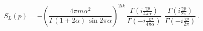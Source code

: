 \begin{equation}\label{S1}
S_L(p) =-\left(\frac{4\pi m\alpha^2}{\Gamma(1+2\alpha)\,\sin 2\pi\alpha }
\right)^{2ik}
\,\frac{\Gamma\left(i\frac{\gamma p}{4\pi\alpha}\right)}
{\Gamma\left(-i\frac{\gamma p}{4\pi\alpha}\right)}\,\
\frac{\Gamma\left(i\frac{\gamma p}{2\pi}\right)}
{\Gamma\left(-i\frac{\gamma p}{2\pi}\right)}\,.
\end{equation}

